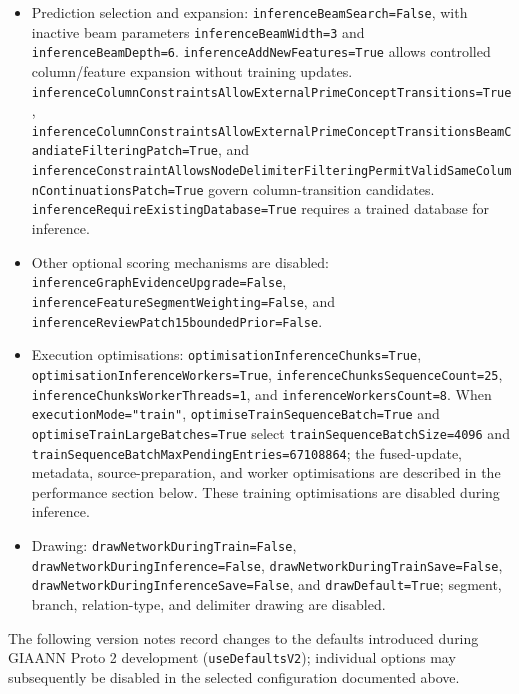 \begin{itemize}
	\item Prediction selection and expansion: \texttt{inferenceBeamSearch=False}, with inactive beam parameters \texttt{inferenceBeamWidth=3} and \texttt{inferenceBeamDepth=6}. \texttt{inferenceAddNewFeatures=True} allows controlled column/feature expansion without training updates. \texttt{inferenceColumnConstraintsAllowExternalPrimeConceptTransitions=True}, \texttt{inferenceColumnConstraintsAllowExternalPrimeConceptTransitionsBeamCandiateFilteringPatch=True}, and \texttt{inferenceConstraintAllowsNodeDelimiterFilteringPermitValidSameColumnContinuationsPatch=True} govern column-transition candidates. \texttt{inferenceRequireExistingDatabase=True} requires a trained database for inference.
	\item Other optional scoring mechanisms are disabled: \texttt{inferenceGraphEvidenceUpgrade=False}, \texttt{inferenceFeatureSegmentWeighting=False}, and \texttt{inferenceReviewPatch15boundedPrior=False}.
	\item Execution optimisations: \texttt{optimisationInferenceChunks=True}, \texttt{optimisationInferenceWorkers=True}, \texttt{inferenceChunksSequenceCount=25}, \texttt{inferenceChunksWorkerThreads=1}, and \texttt{inferenceWorkersCount=8}. When \texttt{executionMode="train"}, \texttt{optimiseTrainSequenceBatch=True} and \texttt{optimiseTrainLargeBatches=True} select \texttt{trainSequenceBatchSize=4096} and \texttt{trainSequenceBatchMaxPendingEntries=67108864}; the fused-update, metadata, source-preparation, and worker optimisations are described in the performance section below. These training optimisations are disabled during inference.
	\item Drawing: \texttt{drawNetworkDuringTrain=False}, \texttt{drawNetworkDuringInference=False}, \texttt{drawNetworkDuringTrainSave=False}, \texttt{drawNetworkDuringInferenceSave=False}, and \texttt{drawDefault=True}; segment, branch, relation-type, and delimiter drawing are disabled.
\end{itemize}

The following version notes record changes to the defaults introduced during GIAANN Proto 2 development (\texttt{useDefaultsV2}); individual options may subsequently be disabled in the selected configuration documented above.


